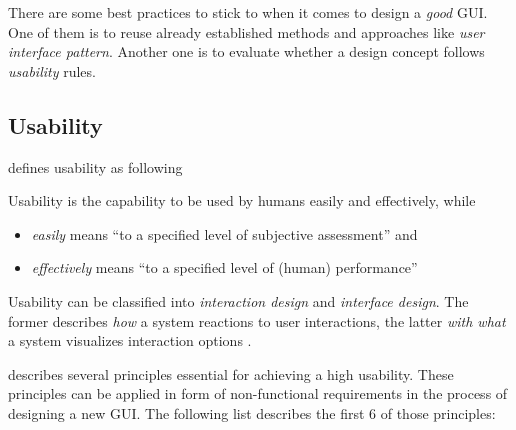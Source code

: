 \documentclass[twoside, openright, 12pt]{book}
\begin{document}
There are some best practices to stick to when it comes to design a \textit{good} GUI.
One of them is to reuse already established methods and approaches like \textit{user interface pattern}.
Another one is to evaluate whether a design concept follows \textit{usability} rules.



\subsection{Usability}
\label{usability}
\cite{Shackel91a} defines usability as following

\begin{xdefinition}[Usability] 
Usability is the capability to be used by humans easily and effectively, while
\begin{itemize}
\item \textit{easily} means ``to a specified level of subjective assessment'' and
\item \textit{effectively} means ``to a specified level of (human) performance''
\end{itemize}
\label{definition:usability}
\end{xdefinition}

\noindent
Usability can be classified into \textit{interaction design} and \textit{interface design}.
The former describes \textit{how} a system reactions to user interactions, the latter \textit{with what} a system visualizes interaction options \citep{Reckling14}.

\cite{Tidwell11} describes several principles essential for achieving a high usability.
These principles can be applied in form of non-functional requirements in the process of designing a new GUI.
The following list describes the first 6 of those principles:
\end{document}

